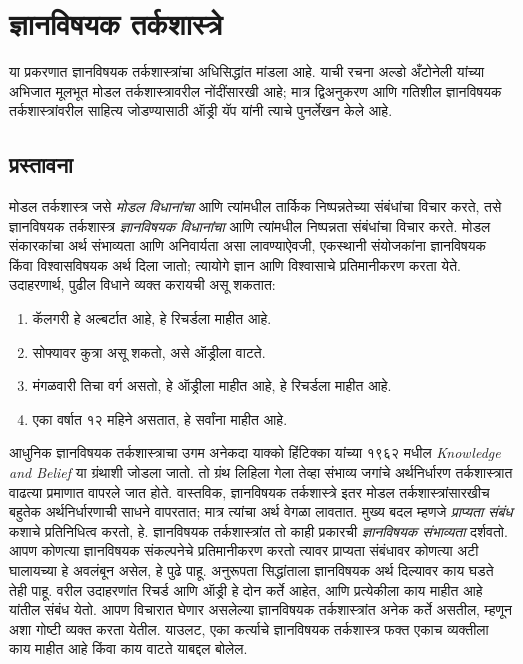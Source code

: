 \chapter{ज्ञानविषयक तर्कशास्त्रे}\label{aml:el:chap}
\begin{editorial}
  या प्रकरणात ज्ञानविषयक तर्कशास्त्रांचा अधिसिद्धांत
  मांडला आहे. याची रचना अल्डो अँटोनेली यांच्या
  अभिजात मूलभूत मोडल तर्कशास्त्रावरील नोंदींसारखी
  आहे; मात्र द्विअनुकरण आणि गतिशील ज्ञानविषयक
  तर्कशास्त्रांवरील साहित्य जोडण्यासाठी ऑड्री यॅप
  यांनी त्याचे पुनर्लेखन केले आहे.
\end{editorial}
\section{प्रस्तावना}\label{aml:el:int:sec}
मोडल तर्कशास्त्र जसे \emph{मोडल विधानांचा} आणि
त्यांमधील तार्किक निष्पन्नतेच्या संबंधांचा विचार
करते, तसे ज्ञानविषयक तर्कशास्त्र \emph{ज्ञानविषयक
विधानांचा} आणि त्यांमधील निष्पन्नता संबंधांचा विचार
करते. मोडल संकारकांचा अर्थ संभाव्यता आणि
अनिवार्यता असा लावण्याऐवजी, एकस्थानी संयोजकांना
ज्ञानविषयक किंवा विश्वासविषयक अर्थ दिला जातो;
त्यायोगे ज्ञान आणि विश्वासाचे प्रतिमानीकरण करता
येते. उदाहरणार्थ, पुढील विधाने व्यक्त करायची
असू शकतात:
\begin{enumerate}
\item कॅलगरी हे अल्बर्टात आहे, हे रिचर्डला माहीत आहे.
\item सोफ्यावर कुत्रा असू शकतो, असे ऑड्रीला वाटते.
\item मंगळवारी तिचा वर्ग असतो, हे ऑड्रीला माहीत
  आहे, हे रिचर्डला माहीत आहे.
\item एका वर्षात १२ महिने असतात, हे सर्वांना माहीत आहे.
\end{enumerate}
आधुनिक ज्ञानविषयक तर्कशास्त्राचा उगम अनेकदा
याक्को हिंटिक्का यांच्या १९६२ मधील \emph{Knowledge
and Belief} या ग्रंथाशी जोडला जातो. तो ग्रंथ
लिहिला गेला तेव्हा संभाव्य जगांचे अर्थनिर्धारण
तर्कशास्त्रात वाढत्या प्रमाणात वापरले जात होते.
वास्तविक, ज्ञानविषयक तर्कशास्त्रे इतर मोडल
तर्कशास्त्रांसारखीच बहुतेक अर्थनिर्धारणाची साधने
वापरतात; मात्र त्यांचा अर्थ वेगळा लावतात. मुख्य
बदल म्हणजे \emph{प्राप्यता संबंध} कशाचे प्रतिनिधित्व
करतो, हे. ज्ञानविषयक तर्कशास्त्रांत तो काही प्रकारची
\emph{ज्ञानविषयक संभाव्यता} दर्शवतो. आपण कोणत्या
ज्ञानविषयक संकल्पनेचे प्रतिमानीकरण करतो त्यावर
प्राप्यता संबंधावर कोणत्या अटी घालायच्या हे अवलंबून
असेल, हे पुढे पाहू. अनुरूपता सिद्धांताला ज्ञानविषयक
अर्थ दिल्यावर काय घडते तेही पाहू. वरील उदाहरणांत
रिचर्ड आणि ऑड्री हे दोन कर्ते आहेत, आणि प्रत्येकीला
काय माहीत आहे यांतील संबंध येतो. आपण विचारात
घेणार असलेल्या ज्ञानविषयक तर्कशास्त्रांत अनेक कर्ते
असतील, म्हणून अशा गोष्टी व्यक्त करता येतील.
याउलट, एका कर्त्याचे ज्ञानविषयक तर्कशास्त्र फक्त
एकाच व्यक्तीला काय माहीत आहे किंवा काय वाटते
याबद्दल बोलेल.
